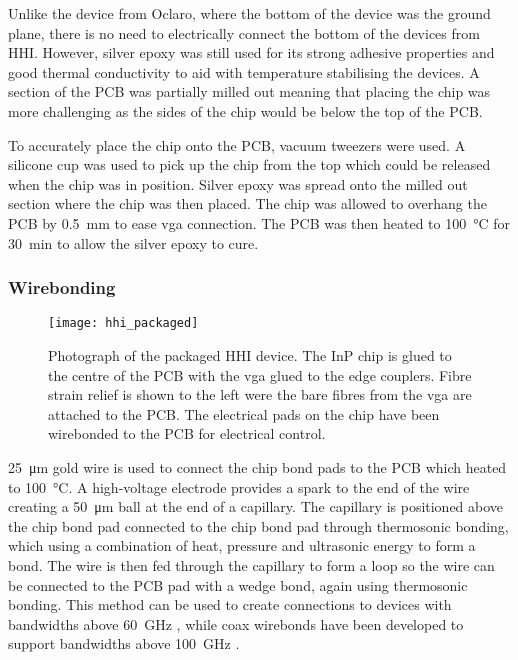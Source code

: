 Unlike the device from Oclaro, where the bottom of the device was the ground plane, there is no need to electrically connect the bottom of the devices from HHI. However, silver epoxy was still used for its strong adhesive properties and good thermal conductivity to aid with temperature stabilising the devices. A section of the PCB was partially milled out meaning that placing the chip was more challenging as the sides of the chip would be below the top of the PCB.

To accurately place the chip onto the PCB, vacuum tweezers were used. A silicone cup was used to pick up the chip from the top which could be released when the chip was in position. Silver epoxy was spread onto the milled out section where the chip was then placed. The chip was allowed to overhang the PCB by \SI{0.5}{\mm} to ease \ac{vga} connection. The PCB was then heated to \SI{100}{\celsius} for \SI{30}{\minute} to allow the silver epoxy to cure.


\subsubsection*{Wirebonding}

\begin{figure}[t]
	\centering
	\texttt{[image: hhi\_packaged]}
	\caption[Photograph of packaged HHI transmitter]{Photograph of the packaged HHI device. The \ac{InP} chip is glued to the centre of the PCB with the \ac{vga} glued to the edge couplers. Fibre strain relief is shown to the left were the bare fibres from the \ac{vga} are attached to the PCB. The electrical pads on the chip have been wirebonded to the PCB for electrical control.}
	\label{fig:hhi_photo}
\end{figure}

\SI{25}{\um} gold wire is used to connect the chip bond pads to the PCB which heated to \SI{100}{\celsius}. A high-voltage electrode provides a spark to the end of the wire creating a \SI{50}{\um} ball at the end of a capillary. The capillary is positioned above the chip bond pad connected to the chip bond pad through thermosonic bonding, which using a combination of heat, pressure and ultrasonic energy to form a bond. The wire is then fed through the capillary to form a loop so the wire can be connected to the PCB pad with a wedge bond, again using thermosonic bonding. This method can be used to create connections to devices with bandwidths above \SI{60}{GHz} \cite{chen2015bandwidth}, while coax wirebonds have been developed to support bandwidths above \SI{100}{GHz} \cite{cahill2006development}.

